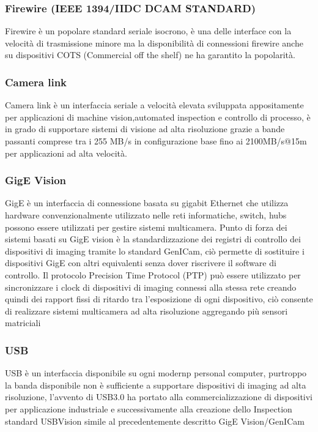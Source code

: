 \subsubsection{Firewire (IEEE 1394/IIDC DCAM STANDARD)}
Firewire è un popolare standard seriale isocrono, è una delle interface con la velocità di trasmissione
minore ma la disponibilità di connessioni firewire anche su dispositivi COTS (Commercial off the shelf) ne ha garantito la popolarità.

\subsubsection{Camera link}
Camera link è un interfaccia seriale a velocità elevata sviluppata appositamente per applicazioni di machine vision,automated inspection e controllo di processo, è in grado di supportare sistemi di visione ad alta risoluzione grazie a bande passanti comprese tra i 255 MB/s in configurazione base fino ai 2100MB/s@15m per applicazioni ad alta velocità.

\subsubsection{GigE Vision}
GigE è un interfaccia di connessione basata su gigabit Ethernet che utilizza
hardware convenzionalmente utilizzato nelle reti informatiche, switch, hubs
possono essere utilizzati per gestire sistemi multicamera. Punto di forza dei
sistemi basati su GigE vision è la standardizzazione dei registri di controllo
dei dispositivi di imaging tramite lo standard GenICam, ciò permette di
sostituire i dispositivi GigE con altri equivalenti senza dover riscrivere il
software di controllo. Il protocolo Precision Time Protocol (PTP) può essere
utilizzato per sincronizzare i clock di dispositivi di imaging connessi alla
stessa rete creando quindi dei rapport fissi di ritardo tra l’esposizione di
ogni dispositivo, ciò consente di realizzare sistemi multicamera ad alta
risoluzione aggregando più sensori matriciali

\subsubsection{USB}
USB è un interfaccia disponibile su ogni modernp personal computer, purtroppo
la banda disponibile non è sufficiente a supportare dispositivi di imaging ad
alta risoluzione, l’avvento di USB3.0 ha portato alla commercializzazione di
dispositivi per applicazione industriale e successivamente alla creazione
dello Inspection standard USBVision simile al precedentemente descritto GigE
Vision/GenICam
